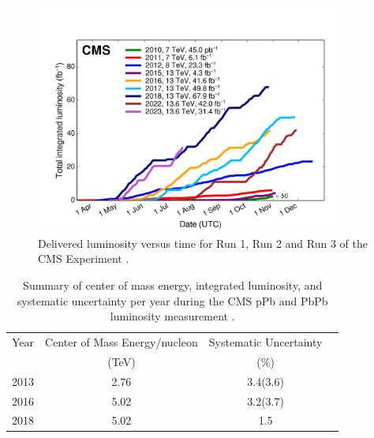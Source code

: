 \begin{figure}[!htp]
\centering
\includegraphics[width=0.9\textwidth]{ashish_thesis/CMS_luminosity.png}
\caption[CMS Integrated luminosity]{%
    Delivered luminosity versus time for Run 1, Run 2 and Run 3 of the CMS Experiment \cite{wikicern_cc}.
}
\label{fig:lumi}
\end{figure}





\begin{table}[h]
  \centering
  \caption[Precision for Run1 and Run2]{Summary of center of mass energy, integrated luminosity, and systematic uncertainty per year during the CMS pPb and PbPb luminosity measurement \cite{CMS-PAS-LUM-13-002} \cite{CMS-PAS-LUM-17-002} \cite{CMS-PAS-LUM-18-001}.}
\begin{tabular}{c c c c}
  Year & Center of Mass Energy/nucleon & Systematic Uncertainty \\
  & (TeV) & (\%) \\
\hline
2013 & 2.76 & 3.4(3.6)  \\
2016 &  5.02  & 3.2(3.7)\\
2018 & 5.02 & 1.5 \\
\end{tabular}
\label{tab:lumi}
\end{table}

